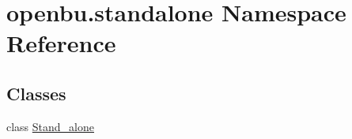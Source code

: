 \hypertarget{namespaceopenbu_1_1standalone}{}\section{openbu.\+standalone Namespace Reference}
\label{namespaceopenbu_1_1standalone}
\subsection*{Classes}
\begin{DoxyCompactItemize}
\item 
class \mbox{\hyperlink{classopenbu_1_1standalone_1_1_stand__alone}{Stand\+\_\+alone}}
\end{DoxyCompactItemize}
